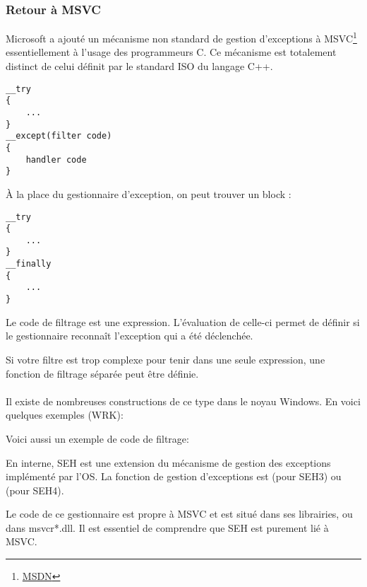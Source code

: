 ﻿\subsubsection{Retour à MSVC}


Microsoft a ajouté un mécanisme non standard de gestion d'exceptions à
MSVC\footnote{\href{http://go.yurichev.com/17057}{MSDN}} essentiellement à l'usage des programmeurs C.
Ce mécanisme est totalement distinct de celui définit par le standard ISO du langage C++.

\begin{lstlisting}[style=customc]
__try
{
    ...
}
__except(filter code)
{
    handler code
}
\end{lstlisting}

À la place du gestionnaire d'exception, on peut trouver un block :

\begin{lstlisting}[style=customc]
__try
{
    ...
}
__finally
{
    ...
}
\end{lstlisting}

Le code de filtrage est une expression. L'évaluation de celle-ci permet de définir si le gestionnaire
reconnaît l'exception qui a été déclenchée.

Si votre filtre est trop complexe pour tenir dans une seule expression, une fonction de filtrage
séparée peut être définie.\\
\\
Il existe de nombreuses constructions de ce type dans le noyau Windows.
En voici quelques exemples (\ac{WRK}):





Voici aussi un exemple de code de filtrage:



En interne, SEH est une extension du mécanisme de gestion des exceptions implémenté par l'OS.
La fonction de gestion d'exceptions est  (pour SEH3) ou
 (pour SEH4).

Le code de ce gestionnaire est propre à MSVC et est situé dans ses librairies, ou dans msvcr*.dll.
Il est essentiel de comprendre que SEH est purement lié à MSVC.

